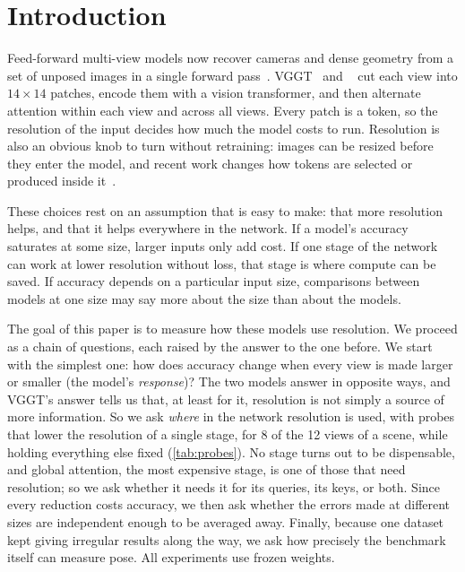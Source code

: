 \section{Introduction}
\label{sec:intro}

Feed-forward multi-view models now recover cameras and dense geometry from a set of unposed images in a single forward pass~\cite{wang2024dust3r,leroy2024mast3r,wang2025vggt,wang2025pi3}. VGGT~\cite{wang2025vggt} and \pithree~\cite{wang2025pi3} cut each view into $14{\times}14$ patches, encode them with a vision transformer, and then alternate attention within each view and across all views. Every patch is a token, so the resolution of the input decides how much the model costs to run. Resolution is also an obvious knob to turn without retraining: images can be resized before they enter the model, and recent work changes how tokens are selected or produced inside it~\cite{goodtoken2026,hdvggt2026}.

These choices rest on an assumption that is easy to make: that more resolution helps, and that it helps everywhere in the network. If a model's accuracy saturates at some size, larger inputs only add cost. If one stage of the network can work at lower resolution without loss, that stage is where compute can be saved. If accuracy depends on a particular input size, comparisons between models at one size may say more about the size than about the models.

The goal of this paper is to measure how these models use resolution. We proceed as a chain of questions, each raised by the answer to the one before. We start with the simplest one: how does accuracy change when every view is made larger or smaller (the model's \emph{response})? The two models answer in opposite ways, and VGGT's answer tells us that, at least for it, resolution is not simply a source of more information. So we ask \emph{where} in the network resolution is used, with probes that lower the resolution of a single stage, for 8 of the 12 views of a scene, while holding everything else fixed (\cref{tab:probes}). No stage turns out to be dispensable, and global attention, the most expensive stage, is one of those that need resolution; so we ask whether it needs it for its queries, its keys, or both. Since every reduction costs accuracy, we then ask whether the errors made at different sizes are independent enough to be averaged away. Finally, because one dataset kept giving irregular results along the way, we ask how precisely the benchmark itself can measure pose. All experiments use frozen weights.

